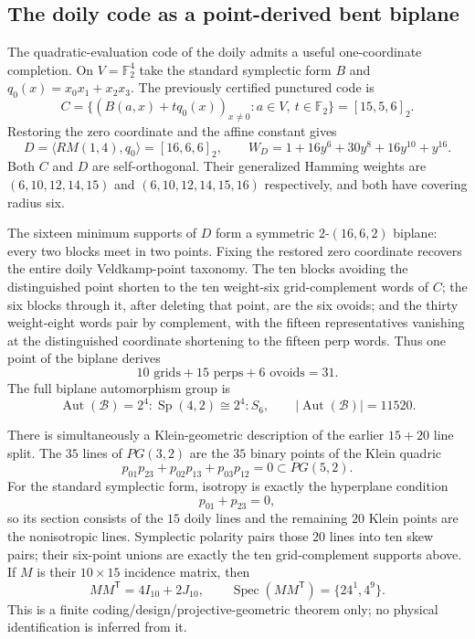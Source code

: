 \subsection{The doily code as a point-derived bent biplane}
\label{subsec:bent-biplane-klein}

The quadratic-evaluation code of the doily admits a useful one-coordinate completion.  On
$V=\mathbb F_2^4$ take the standard symplectic form $B$ and
$q_0(x)=x_0x_1+x_2x_3$.  The previously certified punctured code is
\[
 C=\{(B(a,x)+tq_0(x))_{x\ne0}:a\in V,\ t\in\mathbb F_2\}
   =[15,5,6]_2.
\]
Restoring the zero coordinate and the affine constant gives
\[
 D=\langle RM(1,4),q_0\rangle=[16,6,6]_2,
 \qquad
 W_D=1+16y^6+30y^8+16y^{10}+y^{16}.
\]
Both $C$ and $D$ are self-orthogonal.  Their generalized Hamming weights are
$(6,10,12,14,15)$ and $(6,10,12,14,15,16)$ respectively, and both have
covering radius six.

The sixteen minimum supports of $D$ form a symmetric $2$-$(16,6,2)$ biplane:
every two blocks meet in two points.  Fixing the restored zero coordinate recovers the
entire doily Veldkamp-point taxonomy.  The ten blocks avoiding the distinguished point
shorten to the ten weight-six grid-complement words of $C$; the six blocks through it,
after deleting that point, are the six ovoids; and the thirty weight-eight words pair by
complement, with the fifteen representatives vanishing at the distinguished coordinate
shortening to the fifteen perp words.  Thus one point of the biplane derives
\[
 10\text{ grids}+15\text{ perps}+6\text{ ovoids}=31.
\]
The full biplane automorphism group is
\[
 \operatorname{Aut}(\mathcal B)=2^4\!:\operatorname{Sp}(4,2)
 \cong2^4\!:\!S_6,
 \qquad |\operatorname{Aut}(\mathcal B)|=11520.
\]

There is simultaneously a Klein-geometric description of the earlier $15+20$ line split.
The $35$ lines of $PG(3,2)$ are the $35$ binary points of the Klein quadric
\[
 p_{01}p_{23}+p_{02}p_{13}+p_{03}p_{12}=0\subset PG(5,2).
\]
For the standard symplectic form, isotropy is exactly the hyperplane condition
\[
 p_{01}+p_{23}=0,
\]
so its section consists of the $15$ doily lines and the remaining $20$ Klein points are the
nonisotropic lines.  Symplectic polarity pairs those $20$ lines into ten skew pairs; their
six-point unions are exactly the ten grid-complement supports above.  If $M$ is their
$10\times15$ incidence matrix, then
\[
 MM^{\mathsf T}=4I_{10}+2J_{10},
 \qquad
 \operatorname{Spec}(MM^{\mathsf T})=\{24^1,4^9\}.
\]
This is a finite coding/design/projective-geometric theorem only; no physical identification
is inferred from it.
